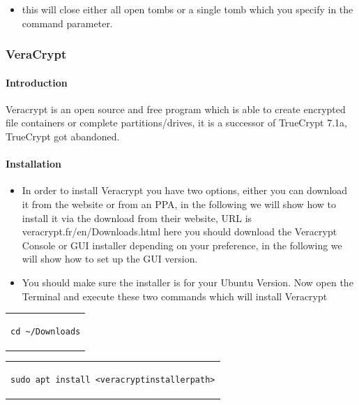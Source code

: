 \documentclass[a4paper,10pt]{article}
\begin{document}
\begin{itemize}[leftmargin=*]
\item this will close either all open tombs or a single tomb which you specify in the command parameter.
\end{itemize}


\subsubsection{VeraCrypt}

\paragraph{Introduction}
Veracrypt is an open source and free program which is able to create encrypted file containers or complete partitions/drives, it is a successor of TrueCrypt 7.1a, TrueCrypt got abandoned.
\paragraph{Installation}
\begin{itemize}[leftmargin=*]
\item In order to install Veracrypt you have two options, either you can download it from the website or from an PPA, in the following we will show how to install it via the download from their website, URL is veracrypt.fr/en/Downloads.html here you should download the Veracrypt Console or GUI installer depending on your preference, in the following we will show how to set up the GUI version.
\item You should make sure the installer is for your Ubuntu Version. Now open the Terminal and execute these two commands which will install Veracrypt
\end{itemize}

\begin{center}
\begin{tabular}{c}
\begin{lstlisting}
cd ~/Downloads
\end{lstlisting}
\end{tabular}
\end{center}
\begin{center}
\begin{tabular}{c}
\begin{lstlisting}
sudo apt install <veracryptinstallerpath>
\end{lstlisting}
\end{tabular}
\end{center}
\end{document}
